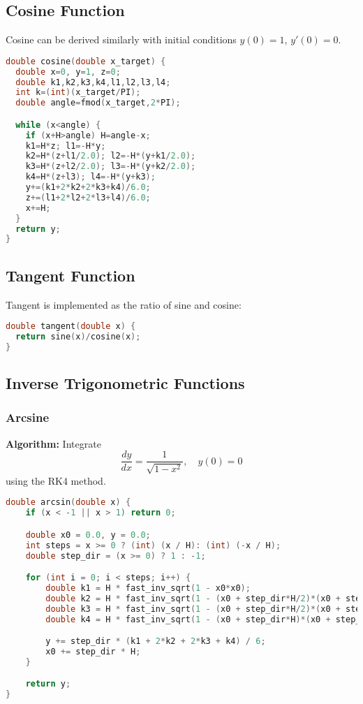 \documentclass[conference]{IEEEtran}
\begin{document}
\subsection{Cosine Function}
Cosine can be derived similarly with initial conditions $y(0)=1$, $y'(0)=0$.

\begin{lstlisting}[language=C, caption={C Implementation of Cosine Function}]
double cosine(double x_target) {
  double x=0, y=1, z=0;
  double k1,k2,k3,k4,l1,l2,l3,l4;
  int k=(int)(x_target/PI);
  double angle=fmod(x_target,2*PI);

  while (x<angle) {
    if (x+H>angle) H=angle-x;
    k1=H*z; l1=-H*y;
    k2=H*(z+l1/2.0); l2=-H*(y+k1/2.0);
    k3=H*(z+l2/2.0); l3=-H*(y+k2/2.0);
    k4=H*(z+l3); l4=-H*(y+k3);
    y+=(k1+2*k2+2*k3+k4)/6.0;
    z+=(l1+2*l2+2*l3+l4)/6.0;
    x+=H;
  }
  return y;
}
\end{lstlisting}

\subsection{Tangent Function}
Tangent is implemented as the ratio of sine and cosine:
\begin{lstlisting}[language=C, caption={C Implementation of Tangent Function}]
double tangent(double x) {
  return sine(x)/cosine(x);
}
\end{lstlisting}
\subsection{Inverse Trigonometric Functions}



\subsubsection{Arcsine}
\textbf{Algorithm:} Integrate 
\[
\frac{dy}{dx} = \frac{1}{\sqrt{1-x^2}}, \quad y(0)=0
\]
using the RK4 method.

\begin{lstlisting}[language=C, caption={C Implementation of Arcsine Function}]
double arcsin(double x) {
    if (x < -1 || x > 1) return 0;

    double x0 = 0.0, y = 0.0;
    int steps = x >= 0 ? (int) (x / H): (int) (-x / H); 
    double step_dir = (x >= 0) ? 1 : -1;

    for (int i = 0; i < steps; i++) {
        double k1 = H * fast_inv_sqrt(1 - x0*x0);
        double k2 = H * fast_inv_sqrt(1 - (x0 + step_dir*H/2)*(x0 + step_dir*H/2));
        double k3 = H * fast_inv_sqrt(1 - (x0 + step_dir*H/2)*(x0 + step_dir*H/2));
        double k4 = H * fast_inv_sqrt(1 - (x0 + step_dir*H)*(x0 + step_dir*H));

        y += step_dir * (k1 + 2*k2 + 2*k3 + k4) / 6;
        x0 += step_dir * H;
    }

    return y;
}
\end{lstlisting}
\end{document}
